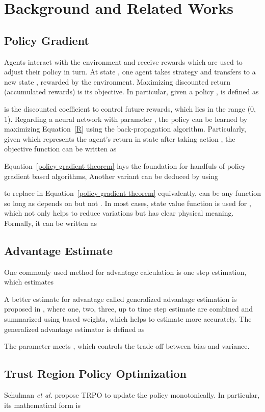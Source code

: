 \documentclass{article}
\begin{document}
\section{Background and Related Works}
\subsection{Policy Gradient}
Agents interact with the environment and receive rewards  which are used to adjust their policy in turn. At state , one agent takes strategy  and transfers to  a new state , rewarded  by the environment. Maximizing discounted return (accumulated rewards)  is its objective. In particular, given a policy ,   is defined as


 is the discounted coefficient to control future rewards, which lies in the range (0, 1). Regarding a neural network with parameter , the policy  can be learned by maximizing Equation~\ref{R} using the back-propagation algorithm. Particularly, given  which represents the agent's return in state  after taking action , the objective function can be written as


Equation~\ref{policy gradient theorem} lays the foundation for handfuls of policy gradient based algorithms,
Another variant  can be deduced by using  

to replace  in Equation~\ref{policy gradient theorem} equivalently,  can be any function so long as   depends on    but not . In most cases, state value function is used for , which not only helps to reduce variations but has clear physical meaning. Formally, it can be written as


\subsection{Advantage Estimate}
One commonly used method for advantage calculation is one step estimation, which estimates 


A better estimate for advantage called generalized advantage estimation is proposed in \cite{2015arXiv150602438S}, where  one, two, three, up to  time step estimate are combined and summarized  using  based weights, which helps to estimate more accurately. The generalized advantage estimator is defined as


The parameter  meets , which controls the trade-off between bias and variance.
\subsection{Trust Region Policy Optimization} \label{TRPO_subsection}
Schulman \textit{et al.} propose TRPO  to  update the policy monotonically. In particular, its mathematical form is \\
\end{document}
